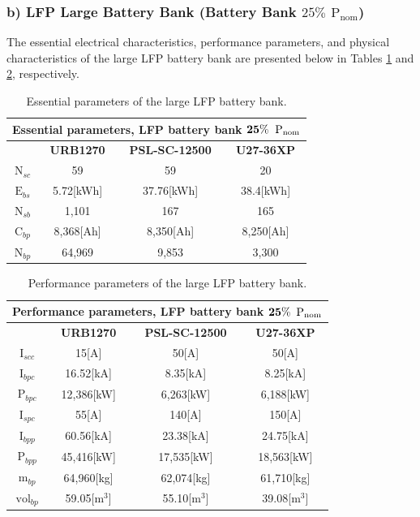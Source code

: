  


\subsubsection{b) LFP Large Battery Bank (Battery Bank $25\%$ ${\text{P}}_{\text{nom}}$)}

The essential electrical characteristics, performance parameters, and physical characteristics of the large LFP battery bank are presented below in Tables \ref{tab:LFP_025_1} and \ref{tab:LFP_025_2}, respectively.

\begin{table}[H]
	\centering
	\caption{Essential parameters of the large LFP battery bank.}
	\label{tab:LFP_025_1}
	\begin{tabular}{|c|c|c|c|}
		\hline
		\multicolumn{4}{|c|}{\textbf{Essential parameters, LFP battery bank} $\bf 25\%$ ${\bf \text{P}}_{\bf \text{nom}}$} \\
		\hline\hline
		 &  \textbf{URB1270} & \textbf{PSL-SC-12500} & \textbf{U27-36XP}\\
		 \hline
		$\text{N}_{sc}$ & 59 & 59 & 20 \\	
		\hline
		$\text{E}_{bs}$ & 5.72[kWh] & 37.76[kWh] & 38.4[kWh]\\	
		\hline
		$\text{N}_{sb}$ & 1,101 & 167 & 165\\	
		\hline
		$\text{C}_{bp}$ & 8,368[Ah] & 8,350[Ah] & 8,250[Ah]\\	
		\hline
		$\text{N}_{bp}$ & 64,969 & 9,853 & 3,300 \\	
		\hline		
	\end{tabular}
\end{table}

\begin{table}[H]
	\centering
	\caption{Performance parameters of the large LFP battery bank.}
	\label{tab:LFP_025_2}
	\begin{tabular}{|c|c|c|c|}
		\hline
		\multicolumn{4}{|c|}{\textbf{Performance parameters, LFP battery bank} $\bf 25\%$ ${\bf \text{P}}_{\bf \text{nom}}$} \\
		\hline\hline
		 &  \textbf{URB1270} & \textbf{PSL-SC-12500} & \textbf{U27-36XP}\\
		 \hline
		$\text{I}_{scc}$ & 15[A]  & 50[A] & 50[A] \\	
		\hline
		$\text{I}_{bpc}$ &  16.52[kA] & 8.35[kA] & 8.25[kA]\\	
		\hline
		$\text{P}_{bpc}$ &   12,386[kW] & 6,263[kW] &  6,188[kW]  \\	
		\hline
		$\text{I}_{spc}$ & 55[A] & 140[A] & 150[A] \\	
		\hline
		$\text{I}_{bpp}$ & 60.56[kA] & 23.38[kA] & 24.75[kA]  \\	
		\hline
		$\text{P}_{bpp}$ & 45,416[kW] & 17,535[kW] & 18,563[kW]  \\	
		\hline
		$\text{m}_{bp}$ & 64,960[kg]  & 62,074[kg] & 61,710[kg] \\	
		\hline
		$\text{vol}_{bp}$ &  59.05[${\text{m}}^{3}$] & 55.10[${\text{m}}^{3}$] & 39.08[${\text{m}}^{3}$]\\	
		\hline		
	\end{tabular}
\end{table}

